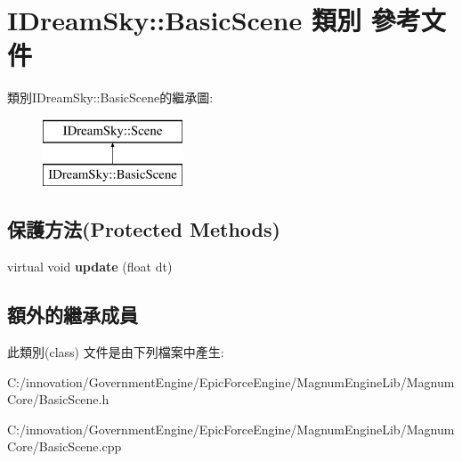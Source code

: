 \hypertarget{class_i_dream_sky_1_1_basic_scene}{}\section{I\+Dream\+Sky\+:\+:Basic\+Scene 類別 參考文件}
\label{class_i_dream_sky_1_1_basic_scene}
類別\+I\+Dream\+Sky\+:\+:Basic\+Scene的繼承圖\+:\begin{figure}[H]
\begin{center}
\leavevmode
\includegraphics[height=2.000000cm]{class_i_dream_sky_1_1_basic_scene}
\end{center}
\end{figure}
\subsection*{保護方法(Protected Methods)}
\begin{DoxyCompactItemize}
\item 
virtual void {\bfseries update} (float dt)\hypertarget{class_i_dream_sky_1_1_basic_scene_a382ad979e86dba40181b6ca906b99315}{}\label{class_i_dream_sky_1_1_basic_scene_a382ad979e86dba40181b6ca906b99315}

\end{DoxyCompactItemize}
\subsection*{額外的繼承成員}


此類別(class) 文件是由下列檔案中產生\+:\begin{DoxyCompactItemize}
\item 
C\+:/innovation/\+Government\+Engine/\+Epic\+Force\+Engine/\+Magnum\+Engine\+Lib/\+Magnum\+Core/Basic\+Scene.\+h\item 
C\+:/innovation/\+Government\+Engine/\+Epic\+Force\+Engine/\+Magnum\+Engine\+Lib/\+Magnum\+Core/Basic\+Scene.\+cpp\end{DoxyCompactItemize}
